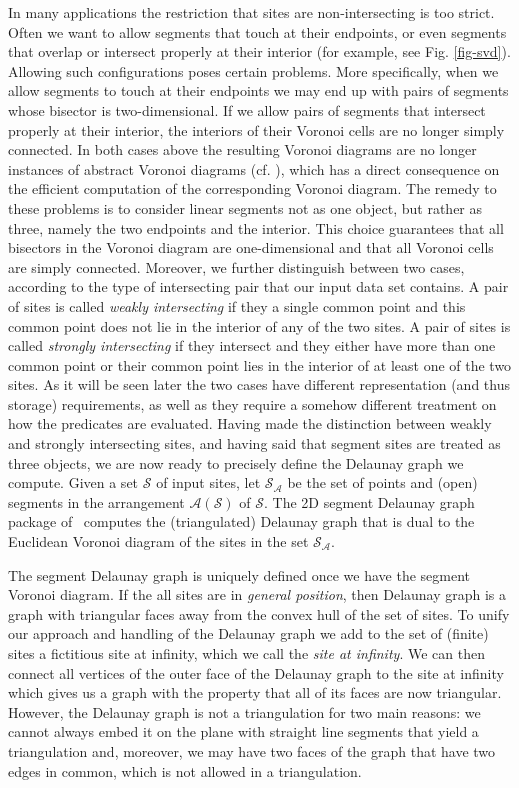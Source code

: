 In many applications the restriction that sites are non-intersecting
is too strict. Often we want to allow segments that touch at their
endpoints, or even segments that overlap or intersect properly at
their interior (for example, see Fig. \ref{fig-svd}). Allowing such
configurations poses certain problems. More specifically, when we allow
segments to touch at their endpoints we may end up with pairs of
segments whose bisector is two-dimensional. If we allow pairs of
segments that intersect properly at their interior, the interiors of
their Voronoi cells are no longer simply connected. In both cases
above the resulting Voronoi diagrams are no longer instances of
abstract Voronoi diagrams (cf. \cite{k-cavd-89}), which has a direct
consequence on the efficient computation of the corresponding Voronoi
diagram. The remedy to these problems is to consider linear segments
not as one object, but rather as three, namely the two endpoints and
the interior. This choice guarantees that all bisectors in the Voronoi
diagram are one-dimensional and that all Voronoi cells are simply
connected. Moreover, we further distinguish between two cases,
according to the type of intersecting pair that our input data set
contains. A pair of sites is called \emph{weakly intersecting} if they
a single common point and this common point does not lie in the
interior of any of the two sites. A pair of sites is called
\emph{strongly intersecting} if they intersect and they either have
more than one common point or their common point lies in the interior
of at least one of the two sites. As it will be seen later the two
cases have different representation (and thus storage) requirements,
as well as they require a somehow different treatment on how the
predicates are evaluated. Having made the distinction between weakly
and strongly intersecting sites, and having said that segment sites
are treated as three objects, we are now ready to precisely define the
Delaunay graph we compute. Given a set $\mathcal{S}$ of input sites,
let $\mathcal{S}_{\mathcal{A}}$ be the set of points and
(open) segments in the arrangement $\mathcal{A}(\mathcal{S})$ of
$\mathcal{S}$. The 2D segment Delaunay graph package of \cgal\
computes the (triangulated) Delaunay graph that is dual to the
Euclidean Voronoi diagram of the sites in the set $\mathcal{S}_{\mathcal{A}}$.

The segment Delaunay graph is uniquely defined once we
have the segment Voronoi diagram. If the all sites are in
\emph{general position}, then Delaunay graph is a graph with triangular
faces away from the convex hull of the set of sites. To unify our approach
and handling of the Delaunay graph we add to the set of (finite) sites
a fictitious site at infinity, which we call the
{\em site at infinity}. We can then connect all vertices of the outer
face of the Delaunay graph to the site at infinity which gives us
a graph with the property that all of its faces are now
triangular. However, the Delaunay graph is not a triangulation for
two main reasons: we cannot always embed it on the plane with straight
line segments that yield a triangulation and, moreover, we may have two
faces of the graph that have two edges in common, which is not allowed
in a triangulation.

